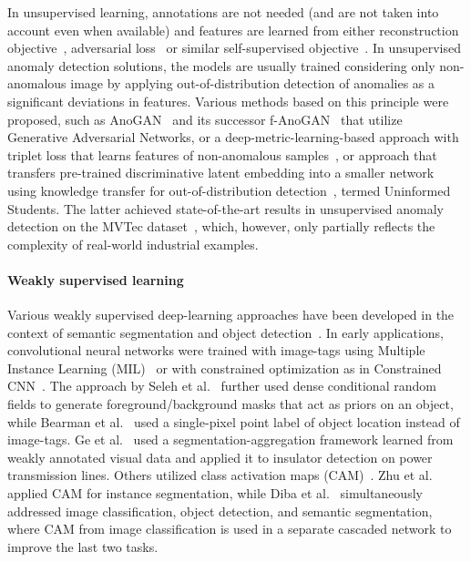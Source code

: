 In unsupervised learning, annotations are not needed (and are not taken into account even when available) and features are learned from either reconstruction objective~\cite{Kingma2014,Chen2017b}, adversarial loss~\cite{Goodfellow2014} or similar self-supervised objective~\cite{Croitoru2017,Wang2017,Zhang2016a}.
In unsupervised anomaly detection solutions, the models are usually trained considering only non-anomalous image by applying out-of-distribution detection 
of anomalies as a significant deviations in features. Various methods based on this principle were proposed, such as AnoGAN~\cite{Schlegl2017} and its successor f-AnoGAN~\cite{Schlegl2019} that utilize Generative Adversarial Networks, or a deep-metric-learning-based approach with triplet loss that learns features of non-anomalous samples~\cite{Staar2018}, or approach that transfers pre-trained discriminative latent embedding into a smaller network using knowledge transfer for out-of-distribution detection~\cite{uninformedStudents}, termed Uninformed Students. The latter achieved state-of-the-art results in unsupervised anomaly detection on the MVTec dataset~\cite{Bergmann2019}, which, however, only partially reflects the complexity of real-world industrial examples.

\paragraph{Weakly supervised learning}
Various weakly supervised deep-learning approaches have been developed in the context of semantic segmentation and object detection~\cite{Pathak2014,Saleh2016,Bearman2016,Li2018,Wan2018,Wan2019}. In early applications, convolutional neural networks were trained with image-tags using Multiple Instance Learning (MIL)~\cite{Pathak2014} or with constrained optimization as in Constrained CNN~\cite{Pathak2015}. The approach by Seleh et al.~\cite{Saleh2016} further used dense conditional random fields to generate foreground/background masks that act as priors on an object, while Bearman et al.~\cite{Bearman2016} used a single-pixel point label of object location instead of image-tags. Ge et al.~\cite{Ge2020} used a segmentation-aggregation framework learned from weakly annotated visual data and applied it to insulator detection on power transmission lines. Others utilized class activation maps (CAM)~\cite{Zhou2015}. Zhu et al.~\cite{Zhu2019} applied CAM for instance segmentation, while Diba et al.~\cite{Diba2017} simultaneously addressed image classification, object detection, and semantic segmentation, where CAM from image classification is used in a separate cascaded network to improve the last two tasks. 


